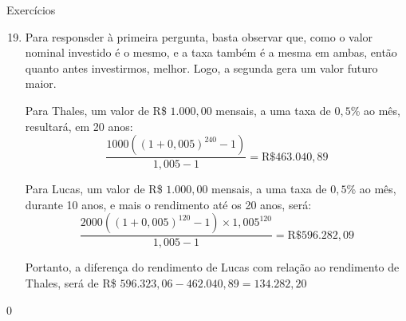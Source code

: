 \begin{resposta}{Exercícios}
{
  \begin{enumerate}\setcounter{enumi}{18}
    \item Para responsder à primeira pergunta, basta observar que, como o valor nominal investido é o mesmo, e a taxa também é a mesma em ambas, então quanto antes investirmos, melhor. Logo, a segunda gera um valor futuro maior.

    Para Thales, um valor de R\$ $1.000,00$ mensais, a uma taxa de $0{,}5$\% ao mês, resultará, em 20 anos:
    \begin{equation*}
    \frac{1000((1+0{,}005)^{240}-1)}{1{,}005-1}=\text{R\$ }463.040{,}89
    \end{equation*}

    Para Lucas, um valor de R\$ $1.000,00$ mensais, a uma taxa de $0{,}5$\% ao mês, durante 10 anos, e mais o rendimento até os 20 anos, será:
    \begin{equation*}
    \frac{2000((1+0{,}005)^{120}-1)\times1{,}005^{120}}{1{,}005-1}=\text{R\$ }596.282{,}09
    \end{equation*}

    Portanto, a diferença do rendimento de Lucas com relação ao rendimento de Thales, será de R\$ $596.323{,}06-462.040{,}89=134.282{,}20$
    \end{enumerate}
}{0}
\end{resposta}

